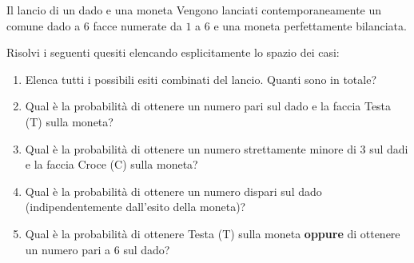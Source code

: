 \begin{esercizio}{Il lancio di un dado e una moneta}
Vengono lanciati contemporaneamente un comune dado a $6$ facce numerate da $1$ a $6$ e una moneta perfettamente bilanciata. 

Risolvi i seguenti quesiti elencando esplicitamente lo spazio dei casi:

\begin{enumerate}[label=\alph*)]
  \item Elenca tutti i possibili esiti combinati del lancio. Quanti sono in totale?
  \item Qual è la probabilità di ottenere un numero pari sul dado e la faccia Testa (T) sulla moneta?
  \item Qual è la probabilità di ottenere un numero strettamente minore di $3$ sul dadi e la faccia Croce (C) sulla moneta?
  \item Qual è la probabilità di ottenere un numero dispari sul dado (indipendentemente dall'esito della moneta)?
  \item Qual è la probabilità di ottenere Testa (T) sulla moneta \textbf{oppure} di ottenere un numero pari a $6$ sul dado?
\end{enumerate}

\responsespace{3.0cm}


\end{esercizio}
